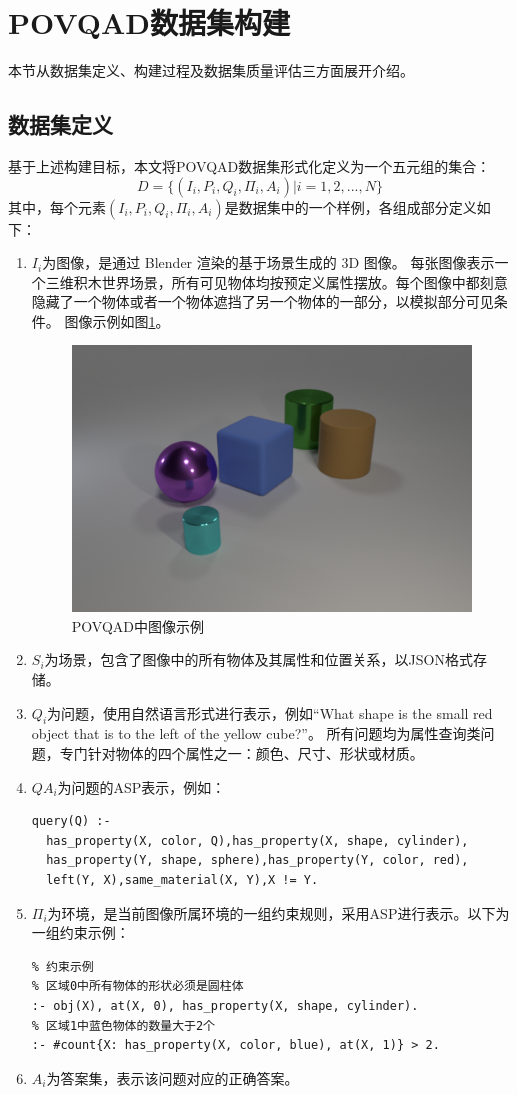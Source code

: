 \section{POVQAD数据集构建}
本节从数据集定义、构建过程及数据集质量评估三方面展开介绍。
\subsection{数据集定义}
基于上述构建目标，本文将POVQAD数据集形式化定义为一个五元组的集合：
$$D = \{ (I_i,P_i,Q_i,\Pi_i ,A_i) | i=1,2,...,N \}$$
其中，每个元素$(I_i,P_i,Q_i,\Pi_i ,A_i)$是数据集中的一个样例，各组成部分定义如下：
\begin{enumerate}[nosep]
\item \textbf{$I_i$}为图像，是通过 Blender 渲染的基于场景生成的 3D 图像。
每张图像表示一个三维积木世界场景，所有可见物体均按预定义属性摆放。每个图像中都刻意隐藏了一个物体或者一个物体遮挡了另一个物体的一部分，以模拟部分可见条件。
图像示例如图\ref{POVQAD-figure}。
\begin{figure}
\centering
\includegraphics[scale=0.6]{figures/POVQAD中图像示例.png}
\caption{POVQAD中图像示例}
\label{POVQAD-figure}
\end{figure}
\item \textbf{$S_i$}为场景，包含了图像中的所有物体及其属性和位置关系，以JSON格式存储。
\item \textbf{$Q_i$}为问题，使用自然语言形式进行表示，例如“What shape is the small red object that is to the left of the yellow cube?”。
所有问题均为属性查询类问题，专门针对物体的四个属性之一：颜色、尺寸、形状或材质。
\item \textbf{$QA_i$}为问题的ASP表示，例如：
\begin{lstlisting}
query(Q) :-
  has_property(X, color, Q),has_property(X, shape, cylinder),
  has_property(Y, shape, sphere),has_property(Y, color, red),
  left(Y, X),same_material(X, Y),X != Y.
\end{lstlisting}
\item \textbf{$\Pi_i$}为环境，是当前图像所属环境的一组约束规则，采用ASP进行表示。以下为一组约束示例：
\begin{lstlisting}
% 约束示例
% 区域0中所有物体的形状必须是圆柱体
:- obj(X), at(X, 0), has_property(X, shape, cylinder).
% 区域1中蓝色物体的数量大于2个
:- #count{X: has_property(X, color, blue), at(X, 1)} > 2.
\end{lstlisting}
\item \textbf{$A_i$}为答案集，表示该问题对应的正确答案。
\end{enumerate}
